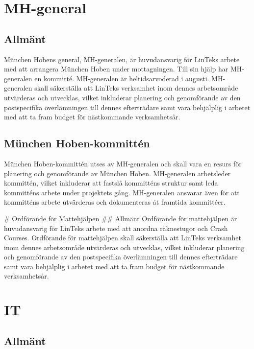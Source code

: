 \hypertarget{mh-general}{%
\section{MH-general}\label{mh-general}}

\hypertarget{allmuxe4nt-10}{%
\subsection{Allmänt}\label{allmuxe4nt-10}}

München Hobens general, MH-generalen, är huvudansvarig för LinTeks
arbete med att arrangera München Hoben under mottagningen. Till sin
hjälp har MH-generalen en kommitté. MH-generalen är heltidsarvoderad i
augusti. MH-generalen skall säkerställa att LinTeks verksamhet inom
dennes arbetsområde utvärderas och utvecklas, vilket inkluderar
planering och genomförande av den postspecifika överlämningen till
dennes efterträdare samt vara behjälplig i arbetet med att ta fram
budget för nästkommande verksamhetsår.

\hypertarget{muxfcnchen-hoben-kommittuxe9n}{%
\subsection{München
Hoben-kommittén}\label{muxfcnchen-hoben-kommittuxe9n}}

München Hoben-kommittén utses av MH-generalen och skall vara en resurs
för planering och genomförande av München Hoben. MH-generalen
arbetsleder kommittén, vilket inkluderar att fastslå kommitténs struktur
samt leda kommitténs arbete under projektets gång. MH-generalen ansvarar
även för att kommitténs arbete utvärderas och dokumenteras åt framtida
kommittéer.

\# Ordförande för Mattehjälpen \#\# Allmänt Ordförande för mattehjälpen
är huvudansvarig för LinTeks arbete med att anordna räknestugor och
Crash Courses. Ordförande för mattehjälpen skall säkerställa att LinTeks
verksamhet inom dennes arbetsområde utvärderas och utvecklas, vilket
inkluderar planering och genomförande av den postspecifika överlämningen
till dennes efterträdare samt vara behjälplig i arbetet med att ta fram
budget för nästkommande verksamhetsår.

\hypertarget{it}{%
\section{IT}\label{it}}

\hypertarget{allmuxe4nt-11}{%
\subsection{Allmänt}\label{allmuxe4nt-11}}

